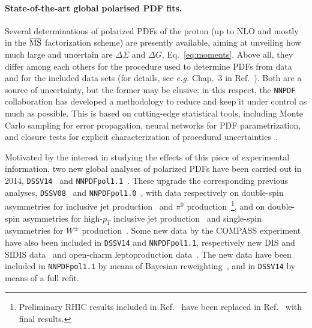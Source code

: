 \paragraph{State-of-the-art global polarised PDF fits.}

Several determinations of polarized PDFs of the proton (up to NLO and mostly 
in the $\overline{\rm MS}$ factorization scheme) are presently available, 
aiming at unveiling how much large and uncertain are $\Delta\Sigma$ and 
$\Delta G$, Eq.~\eqref{eq:moments}. Above all, they differ among each others 
for the procedure used to determine PDFs from data and for the included data 
sets (for details, see {\it e.g.} Chap.~3 in 
Ref.~\cite{Nocera:2014vla}). Both are a source of uncertainty, but the 
former may be elusive: in this respect, the {\tt NNPDF} collaboration has 
developed a methodology to reduce and keep it under control as much as possible.
This is based on cutting-edge statistical tools, including Monte Carlo sampling
for error propagation, neural networks for PDF parametrization, and closure 
tests for explicit characterization of procedural 
uncertainties~\cite{Ball:2014uwa}.

Motivated by the interest in studying the effects of this piece of experimental
information, two new global analyses of polarized PDFs have been carried out in
2014, {\tt DSSV14}~\cite{deFlorian:2014yva} and 
{\tt NNPDFpol1.1}~\cite{Nocera:2014gqa}. 
These upgrade the corresponding previous analyses, 
{\tt DSSV08}~\cite{deFlorian:2008mr} and 
{\tt NNPDFpol1.0}~\cite{Ball:2013lla}, with data respectively on double-spin 
asymmetries for inclusive jet production~\cite{Adamczyk:2014ozi} 
and $\pi^0$ production~\cite{Adare:2014hsq}\footnote{Preliminary RHIC results 
included in Ref.~\cite{deFlorian:2008mr} have been replaced in
Ref.~\cite{deFlorian:2014yva} with final results.}, 
and on double-spin asymmetries for high-$p_T$ inclusive jet 
production~\cite{Adamczyk:2014ozi,Adamczyk:2012qj,Adare:2010cc} and single-spin
asymmetries for $W^\pm$ production~\cite{Adamczyk:2014xyw}.
Some new data by the COMPASS experiment have also been included in 
{\tt DSSV14} and {\tt NNPDFpol1.1}, respectively new DIS and SIDIS 
data~\cite{Alekseev:2010hc,Alekseev:2010ub} and open-charm leptoproduction 
data~\cite{Adolph:2012ca}. The new data have been included in {\tt NNPDFpol1.1}
by means of Bayesian reweighting~\cite{Ball:2010gb},
and in {\tt DSSV14} by means of a full refit.  

